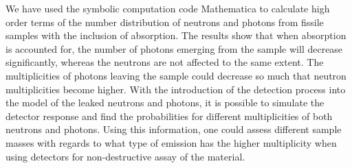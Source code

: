 \documentclass[landscape,a0,final,a4resizeable]{a0poster}
\newenvironment{poster}{
  \begin{center}
  \begin{minipage}[c]{0.98\textwidth}
}{
  \end{minipage}
  \end{center}
}
\newcommand{\pbox}[4]{
\psshadowbox[#3]{
\begin{minipage}[t][#2][t]{#1}
#4
\end{minipage}
}}
\begin{document}
\begin{poster}
\begin{multicols}{4}
\vspace{2cm}\begin{center}\pbox{0.8\columnwidth}{}{linewidth=2mm,framearc=0.1,linecolor=lightblue,fillstyle=gradient,gradangle=0,gradbegin=white,gradend=whiteblue,gradmidpoint=1.0,framesep=1em}{\begin{center}\Large
\bf Conclusions\end{center}}\end{center}\vspace{1.25cm}


We have used the symbolic computation code Mathematica to
calculate high order terms of the number distribution of neutrons
and photons from fissile samples with the inclusion of absorption.
The results show that when absorption is accounted for, the number
of photons emerging from the sample will decrease significantly,
whereas the neutrons are not affected to the same extent. The
multiplicities of photons leaving the sample could decrease so
much that neutron multiplicities become higher. With the
introduction of the detection process into the model of the leaked
neutrons and photons, it is possible to simulate the detector
response and find the probabilities for different multiplicities
of both neutrons and photons. Using this information, one could
assess different sample masses with regards to what type of
emission has the higher multiplicity when using detectors for
non-destructive assay of the material.




%
%


\end{multicols}

\end{poster}
\end{document}
